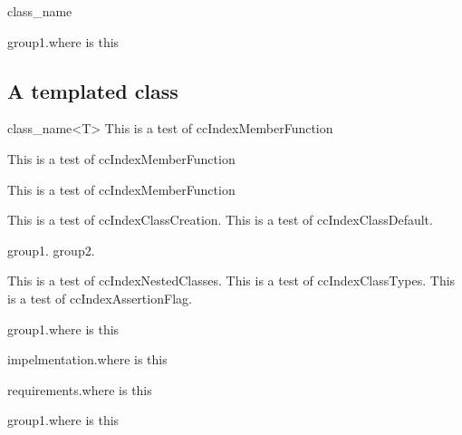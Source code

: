 \documentclass{article}
\begin{document}
{{{{\begin{ccClass}{class_name}
\begin{ccIndexGlobalFunctions}
\pagebreak
group1.where is this

\end{ccIndexGlobalFunctions}


\end{ccClass}

\subsection{A templated class}

\begin{ccClassTemplate}{class_name<T>}
This is a test of ccIndexMemberFunction

This is a test of ccIndexMemberFunction

This is a test of ccIndexMemberFunction

This is a test of ccIndexClassCreation\ccIndexClassCreation.
This is a test of ccIndexClassDefault\ccIndexClassDefault.
\begin{ccIndexMemberFunctions}
       {}

group1.
group2.
\end{ccIndexMemberFunctions}
This is a test of ccIndexNestedClasses\ccIndexNestedClasses.
This is a test of ccIndexClassTypes\ccIndexClassTypes.
This is a test of ccIndexAssertionFlag.
\begin{ccIndexGlobalFunctions}
\pagebreak
group1.where is this

\end{ccIndexGlobalFunctions}

impelmentation\ccIndexImplementation.where is this

requirements\ccIndexRequirements.where is this
\begin{ccIndexGlobalFunctions}
\pagebreak
group1.where is this

\end{ccIndexGlobalFunctions}

\end{ccClassTemplate}

}}}}
\end{document}
